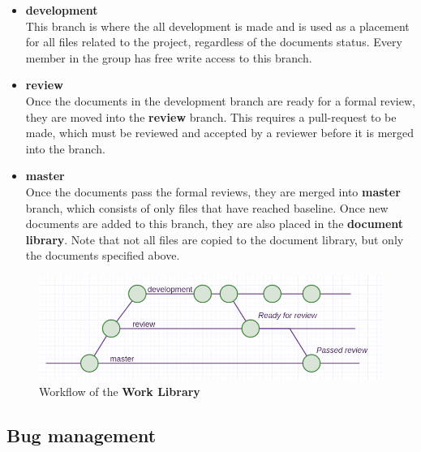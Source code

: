 \documentclass{article}
\begin{document}
            \begin{itemize}
                \item \textbf{development} \\
                This branch is where the all development is made and is used as a placement for all files related
                to the project, regardless of the documents status.
                Every member in the group has free write access to this branch.
                
                \item \textbf{review} \\
                Once the documents in the development branch are ready for a formal review,  they are moved
                into the \textbf{review} branch. This requires a pull-request to be made, which must be
                reviewed and accepted by a reviewer before it is merged into the branch.
                
                \item \textbf{master} \\
                Once the documents pass the formal reviews, they are merged into \textbf{master} branch,
                which consists of only files that have reached baseline.
                Once new documents are added to this branch, they are also placed in the \textbf{document library}.
                Note that not all files are copied to the document library, but only the documents specified above.
                
            \end{itemize}
            
            \begin{figure}[h]
                \centering
                \includegraphics[scale=0.45]{images/workflow.png}
                \caption{Workflow of the \textbf{Work Library}}
                \label{bigdog}
            \end{figure}
        
    \subsection{Bug management}
    
\end{document}
